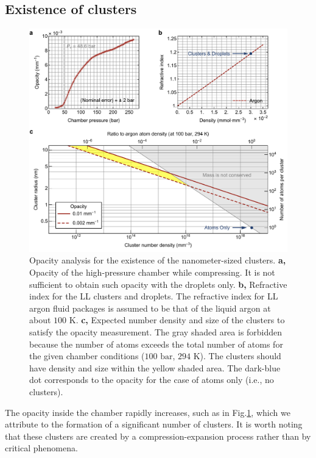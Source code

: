 \subsection{Existence of clusters}
\label{sec:ch2-3-4}

\begin{figure}[ht!]
\centering
\includegraphics[width=130mm]{figures/ch2/cluster/opacity.pdf}
\caption{Opacity analysis for the existence of the nanometer-sized clusters. \textbf{a,} Opacity of the high-pressure chamber while compressing. It is not sufficient to obtain such opacity with the droplets only. \textbf{b,} Refractive index for the LL clusters and droplets. The refractive index for LL argon fluid packages is assumed to be that of the liquid argon at about $100 \text{ K}$. \textbf{c,} Expected number density and size of the clusters to satisfy the opacity measurement. The gray shaded area is forbidden because the number of atoms exceeds the total number of atoms for the given chamber conditions ($100 \text{ bar}$, $294 \text{ K}$). The clusters should have density and size within the yellow shaded area. The dark-blue dot corresponds to the opacity for the case of atoms only (i.e., no clusters).}
\label{fig:opacity}
\end{figure}

The opacity inside the chamber rapidly increases, such as in Fig.\ref{fig:opacity}, which we attribute to the formation of a significant number of clusters. It is worth noting that these clusters are created by a compression-expansion process rather than by critical phenomena.

